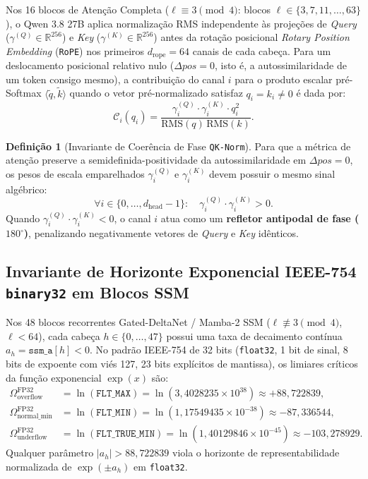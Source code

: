 \documentclass[11pt,a4paper]{article}
\theoremstyle{definition}
\newtheorem{definition}{Definição}
\begin{document}
Nos 16 blocos de Atenção Completa ($\ell \equiv 3 \pmod 4$: blocos $\ell \in \{3, 7, 11, \dots, 63\}$), o Qwen 3.8 27B aplica normalização RMS independente às projeções de \textit{Query} ($\gamma^{(Q)} \in \mathbb{R}^{256}$) e \textit{Key} ($\gamma^{(K)} \in \mathbb{R}^{256}$) antes da rotação posicional \textit{Rotary Position Embedding} (\texttt{RoPE}) nos primeiros $d_{\text{rope}} = 64$ canais de cada cabeça. Para um deslocamento posicional relativo nulo ($\Delta pos = 0$, isto é, a autossimilaridade de um token consigo mesmo), a contribuição do canal $i$ para o produto escalar pré-Softmax $\langle \tilde{q}, \tilde{k} \rangle$ quando o vetor pré-normalizado satisfaz $q_i = k_i \neq 0$ é dada por:
\begin{equation}
    \mathcal{C}_i(q_i) = \frac{\gamma_i^{(Q)} \cdot \gamma_i^{(K)} \cdot q_i^2}{\text{RMS}(q)\,\text{RMS}(k)}.
    \label{eq:qknorm_contrib}
\end{equation}

\begin{definition}[Invariante de Coerência de Fase \texttt{QK-Norm}]
Para que a métrica de atenção preserve a semidefinida-positividade da autossimilaridade em $\Delta pos = 0$, os pesos de escala emparelhados $\gamma_i^{(Q)}$ e $\gamma_i^{(K)}$ devem possuir o mesmo sinal algébrico:
\begin{equation}
    \forall i \in \{0, \dots, d_{\text{head}}-1\}: \quad \gamma_i^{(Q)} \cdot \gamma_i^{(K)} > 0.
\end{equation}
Quando $\gamma_i^{(Q)} \cdot \gamma_i^{(K)} < 0$, o canal $i$ atua como um \textbf{refletor antipodal de fase ($180^\circ$)}, penalizando negativamente vetores de \textit{Query} e \textit{Key} idênticos.
\end{definition}

\subsection{Invariante de Horizonte Exponencial IEEE-754 \texttt{binary32} em Blocos SSM}

Nos 48 blocos recorrentes Gated-DeltaNet / Mamba-2 SSM ($\ell \not\equiv 3 \pmod 4$, $\ell < 64$), cada cabeça $h \in \{0, \dots, 47\}$ possui uma taxa de decaimento contínua $a_h = \texttt{ssm\_a}[h] < 0$. No padrão IEEE-754 de 32 bits (\texttt{float32}, 1 bit de sinal, 8 bits de expoente com viés 127, 23 bits explícitos de mantissa), os limiares críticos da função exponencial $\exp(x)$ são:
\begin{align}
    \Omega_{\text{overflow}}^{\text{FP32}} &= \ln(\texttt{FLT\_MAX}) = \ln(3{,}4028235 \times 10^{38}) \approx +88{,}722839, \\
    \Omega_{\text{normal\_min}}^{\text{FP32}} &= \ln(\texttt{FLT\_MIN}) = \ln(1{,}17549435 \times 10^{-38}) \approx -87{,}336544, \\
    \Omega_{\text{underflow}}^{\text{FP32}} &= \ln(\texttt{FLT\_TRUE\_MIN}) = \ln(1{,}40129846 \times 10^{-45}) \approx -103{,}278929.
\end{align}
Qualquer parâmetro $|a_h| > 88{,}722839$ viola o horizonte de representabilidade normalizada de $\exp(\pm a_h)$ em \texttt{float32}.
\end{document}
